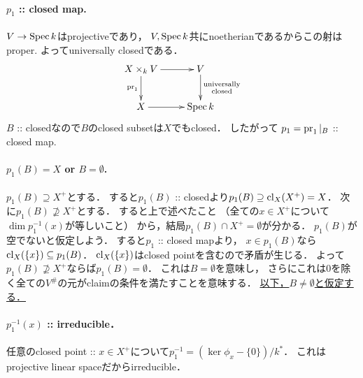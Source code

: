 \documentclass[a4paper]{jsarticle}
\begin{document}
    \paragraph{$p_1$ :: closed map.}
    $V \to \operatorname{Spec} k$はprojectiveであり，
    $V, \operatorname{Spec} k$共にnoetherianであるからこの射はproper.
    よってuniversally closedである．
    \[
    \xymatrix
    {
        X \times_k V \ar[r]\ar[d]_-{\pr_1}& V
            \ar[d]^-{\substack{\text{universally} \\ \text{closed}}}\\
        X \ar[r]& \Spec k
    }
    \]
    $B$ :: closedなので$B$のclosed subsetは$X$でもclosed．
    したがって
    $p_1=\operatorname{pr}_1|_B$ :: closed map.

    \paragraph{$p_1(B)=X$ or $B=\emptyset$.}
    $p_1(B) \supseteq X^+$とする．
    すると$p_1(B)$ :: closedより$p_1(B) \supseteq \operatorname{cl}_X(X^+)=X$．
    次に$p_1(B) \not \supseteq X^+$とする．
    すると上で述べたこと
    （全ての$x \in X^+$について$\dim p_1^{-1}(x)$が等しいこと）
    から，結局$p_1(B) \cap X^+=\emptyset$が分かる．
    $p_1(B)$が空でないと仮定しよう．
    すると$p_1$ :: closed mapより，
    $x \in p_1(B)$なら$\operatorname{cl}_X(\{x\}) \subseteq p_1(B)$．
    $\operatorname{cl}_X(\{x\})$はclosed pointを含むので矛盾が生じる．
    よって$p_1(B) \not \supseteq X^+$ならば$p_1(B)=\emptyset$．
    これは$B=\emptyset$を意味し，
    さらにこれは$0$を除く全ての$V^{\#}$の元がclaimの条件を満たすことを意味する．
    \underline{以下，$B \neq \emptyset$と仮定する．}

    \paragraph{$p_1^{-1}(x)$ :: irreducible．}
    任意のclosed point :: $x \in X^+$について$p_1^{-1}=(\ker \phi_x-\{0\})/k^*$．
    これはprojective linear spaceだからirreducible．
\end{document}
